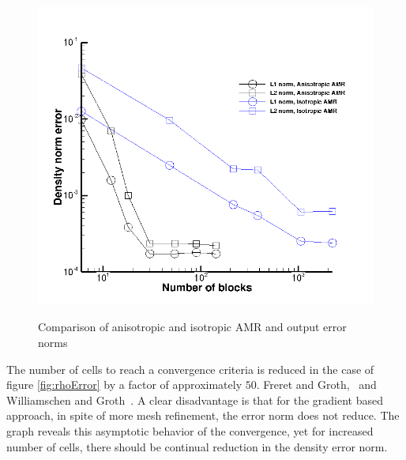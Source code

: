 \begin{figure}[t!]
{   \includegraphics[width=0.2\textheight, trim=0cm 0cm 0 0cm,clip=true]{./figs/outflowError.png}}%
   \caption{Comparison of anisotropic and isotropic AMR and output error norms}  
   \label{fig:Gradientbased}
\end{figure}  


The number of cells to reach a convergence criteria is reduced in the case of figure \ref{fig:rhoError} by a factor of approximately $50$. Freret and Groth,~\cite{Freret:2015} and Williamschen and Groth~\cite{Williamschen:2013}.
A clear disadvantage is that for the gradient based approach, in spite of more mesh refinement, the error norm does not reduce. The graph reveals this asymptotic behavior of the convergence, yet for increased number of cells, there should be continual reduction in the density error norm.
